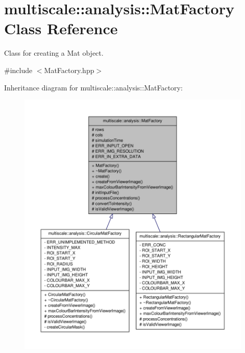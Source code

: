 \hypertarget{classmultiscale_1_1analysis_1_1MatFactory}{\section{multiscale\-:\-:analysis\-:\-:\-Mat\-Factory \-Class \-Reference}
\label{classmultiscale_1_1analysis_1_1MatFactory}
}


\-Class for creating a \-Mat object.  




{\ttfamily \#include $<$\-Mat\-Factory.\-hpp$>$}



\-Inheritance diagram for multiscale\-:\-:analysis\-:\-:\-Mat\-Factory\-:\nopagebreak
\begin{figure}[H]
\begin{center}
\leavevmode
\includegraphics[width=350pt]{classmultiscale_1_1analysis_1_1MatFactory__inherit__graph}
\end{center}
\end{figure}
